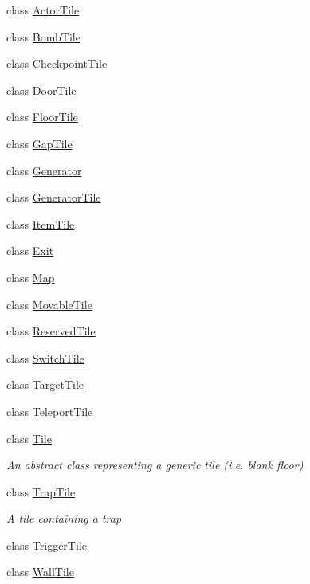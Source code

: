 \begin{DoxyCompactItemize}
class \hyperlink{class_gruppe22_1_1_backend_1_1_actor_tile}{Actor\-Tile}
\item 
class \hyperlink{class_gruppe22_1_1_backend_1_1_bomb_tile}{Bomb\-Tile}
\item 
class \hyperlink{class_gruppe22_1_1_backend_1_1_checkpoint_tile}{Checkpoint\-Tile}
\item 
class \hyperlink{class_gruppe22_1_1_backend_1_1_door_tile}{Door\-Tile}
\item 
class \hyperlink{class_gruppe22_1_1_backend_1_1_floor_tile}{Floor\-Tile}
\item 
class \hyperlink{class_gruppe22_1_1_backend_1_1_gap_tile}{Gap\-Tile}
\item 
class \hyperlink{class_gruppe22_1_1_backend_1_1_generator}{Generator}
\item 
class \hyperlink{class_gruppe22_1_1_backend_1_1_generator_tile}{Generator\-Tile}
\item 
class \hyperlink{class_gruppe22_1_1_backend_1_1_item_tile}{Item\-Tile}
\item 
class \hyperlink{class_gruppe22_1_1_backend_1_1_exit}{Exit}
\item 
class \hyperlink{class_gruppe22_1_1_backend_1_1_map}{Map}
\item 
class \hyperlink{class_gruppe22_1_1_backend_1_1_movable_tile}{Movable\-Tile}
\item 
class \hyperlink{class_gruppe22_1_1_backend_1_1_reserved_tile}{Reserved\-Tile}
\item 
class \hyperlink{class_gruppe22_1_1_backend_1_1_switch_tile}{Switch\-Tile}
\item 
class \hyperlink{class_gruppe22_1_1_backend_1_1_target_tile}{Target\-Tile}
\item 
class \hyperlink{class_gruppe22_1_1_backend_1_1_teleport_tile}{Teleport\-Tile}
\item 
class \hyperlink{class_gruppe22_1_1_backend_1_1_tile}{Tile}
\begin{DoxyCompactList}\small\item\em An abstract class representing a generic tile (i.\-e. blank floor) \end{DoxyCompactList}\item 
class \hyperlink{class_gruppe22_1_1_backend_1_1_trap_tile}{Trap\-Tile}
\begin{DoxyCompactList}\small\item\em A tile containing a trap \end{DoxyCompactList}\item 
class \hyperlink{class_gruppe22_1_1_backend_1_1_trigger_tile}{Trigger\-Tile}
\item 
class \hyperlink{class_gruppe22_1_1_backend_1_1_wall_tile}{Wall\-Tile}
\end{DoxyCompactItemize}
